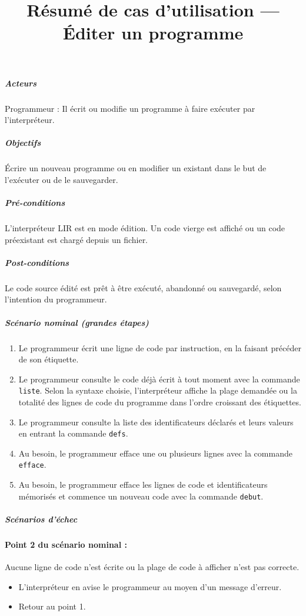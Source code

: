 
\title{Résumé de cas d'utilisation --- Éditer un programme} %


        \subparagraph{Acteurs}
            Programmeur : Il écrit ou modifie un programme à faire exécuter par
            l'interpréteur.

        \subparagraph{Objectifs}
            Écrire un nouveau programme ou en modifier un existant dans le
            but de l'exécuter ou de le sauvegarder.

        \subparagraph{Pré-conditions}
                L'interpréteur LIR est en mode édition. Un code vierge est
                affiché ou un code préexistant est chargé depuis un fichier.

        \subparagraph{Post-conditions}
                Le code source édité est prêt à être exécuté, abandonné ou sauvegardé,
                selon l'intention du programmeur.

        \subparagraph{Scénario nominal (grandes étapes)}
            \begin{enumerate}
                \item Le programmeur écrit une ligne de code par instruction, en la
                      faisant précéder de son étiquette.

                \item Le programmeur consulte le code déjà écrit à tout moment avec la
                      commande \verb|liste|. Selon la syntaxe choisie, l'interpréteur
                      affiche la plage demandée ou la totalité des lignes de code
                      du programme dans l'ordre croissant des étiquettes.

                \item Le programmeur consulte la liste des identificateurs déclarés et
                      leurs valeurs en entrant la commande \verb|defs|.

                \item Au besoin, le programmeur efface une ou plusieurs lignes avec la
                      commande \verb|efface|.

                \item Au besoin, le programmeur efface les lignes de code et identificateurs
                      mémorisés et commence un nouveau code avec la commande \verb|debut|.
            \end{enumerate}

        \subparagraph{Scénarios d'échec}

            \paragraph{Point 2 du scénario nominal :} Aucune ligne de code n'est écrite ou
            la plage de code à afficher n'est pas correcte.
            \begin{itemize}
                \item L'interpréteur en avise le programmeur au moyen d'un message d'erreur.
                \item Retour au point 1.
            \end{itemize}

